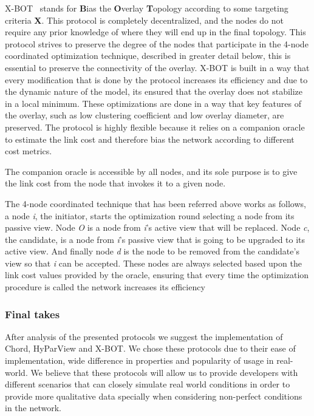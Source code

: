 X-BOT~\cite{xbot} stands for \textbf{B}ias the \textbf{O}verlay \textbf{T}opology
according to some targeting criteria \textbf{X}. This protocol is completely decentralized,
and the nodes do not require any prior knowledge of where they will end up in the final topology. 
This protocol strives to preserve the degree of the nodes that participate in the 4-node coordinated
optimization technique, described in greater detail below, this is essential to preserve
the connectivity of the overlay. X-BOT is built in a way that every modification that is
done by the protocol increases its efficiency and due to the dynamic nature of the model,
its ensured that the overlay does not stabilize in a local minimum. These optimizations
are done in a way that key features of the overlay, such as low clustering coefficient and
low overlay diameter, are preserved. The protocol is highly flexible because it relies on a
companion oracle to estimate the link cost and therefore bias the network according to
different cost metrics.

The companion oracle is accessible by all nodes, and its sole purpose is to give the
link cost from the node that invokes it to a given node.

The 4-node coordinated technique that has been referred above works as follows, a
node \textit{i}, the initiator, starts the optimization round selecting a node from
its passive view. Node \textit{O} is a node from \textit{i}'s active view that
will be replaced. Node \textit{c}, the candidate, is a node from \textit{i}'s passive
view that is going to be upgraded to its active view. And finally node \textit{d}
is the node to be removed from the candidate's view so that \textit{i} can be accepted.
These nodes are always selected based upon the link cost values provided by the oracle,
ensuring that every time the optimization procedure is called the network increases its
efficiency

\subsubsection{Final takes}\label{subsec:final_takes_membership}

After analysis of the presented protocols we suggest the implementation of Chord,
HyParView and X-BOT. We chose these protocols due to their ease of implementation,
wide difference in properties and popularity of usage in real-world. We believe that
these protocols will allow us to provide developers with different scenarios that
can closely simulate real world conditions in order to provide more qualitative data
specially when considering non-perfect conditions in the network.

